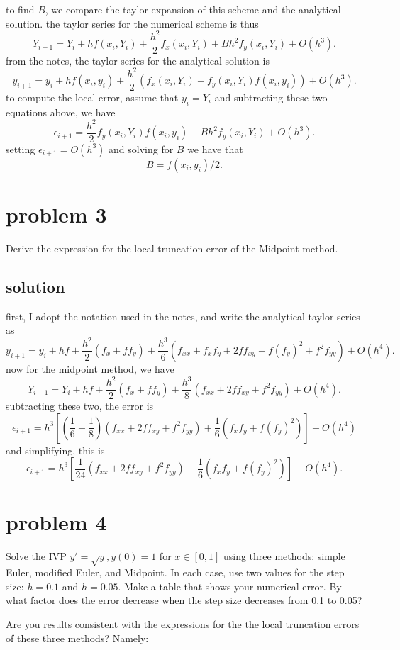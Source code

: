 \documentclass[letterpaper,10pt,english]{/Library/Python/2.7/site-packages/Sphinx-1.2-py2.7.egg/sphinx/texinputs/sphinxhowto}
\begin{document}
to find $B$, we compare the taylor expansion of this scheme and the
analytical solution. the taylor series for the numerical scheme is thus
\[ Y_{i+1} = Y_i + hf(x_i,Y_i) + \frac{h^2}{2} f_x (x_i,Y_i) + Bh^2 f_y(x_i,Y_i) + O(h^3) .\]
from the notes, the taylor series for the analytical solution is
\[ y_{i+1} = y_i + hf(x_i,y_i) + \frac{h^2}{2} (f_x (x_i,Y_i) + f_y(x_i,Y_i)f(x_i,y_i)) + O(h^3) .\]
to compute the local error, assume that $y_i = Y_i$ and subtracting
these two equations above, we have
\[ \epsilon _{i+1}  = \frac{h^2}{2}f_y(x_i,Y_i)f(x_i,y_i) - Bh^2 f_y(x_i,Y_i) + O(h^3) .\]
setting $\epsilon _{i+1} = O(h^3)$ and solving for $B$ we have that
\[ B = f(x_i,y_i) / 2.\]\section{problem 3}Derive the expression for the local truncation error of the Midpoint
method.\subsection{solution}first, I adopt the notation used in the notes, and write the analytical
taylor series as
\[ y_{i+1} = y_i + hf + \frac{h^2}{2} (f_x +ff_y) + \frac{h^3}{6} (f_{xx} + f_x f_y + 2 f f_{xy} + f (f_y)^2 + f^2 f_{yy} ) + O(h^4) .\]
now for the midpoint method, we have
\[ Y_{i+1} = Y_i + hf + \frac{h^2}{2} (f_x +ff_y) + \frac{h^3}{8} (f_{xx} + 2 f f_{xy} +  f^2 f_{yy} ) + O(h^4) .\]
subtracting these two, the error is
\[ \epsilon _{i+1}  = h^3 \left [ \left (\frac{1}{6} - \frac{1}{8} \right )  \left ( f_{xx} + 2ff_{xy} + f^2 f_{yy} \right ) + \frac{1}{6} \left ( f_xf_y + f (f_y)^2 \right ) \right ] + O(h^4)\]
and simplifying, this is
\[ \epsilon _{i+1}  = h^3 \left [ \frac{1}{24}  \left ( f_{xx} + 2ff_{xy} + f^2 f_{yy} \right ) + \frac{1}{6} \left ( f_xf_y + f (f_y)^2 \right ) \right ] + O(h^4).\]\section{problem 4}Solve the IVP $y' = \sqrt{y}, y(0) = 1$ for $x\in [0,1]$ using three
methods: simple Euler, modified Euler, and Midpoint. In each case, use
two values for the step size: $h = 0.1$ and $h=0.05$. Make a table that
shows your numerical error. By what factor does the error decrease when
the step size decreases from 0.1 to 0.05?

Are you results consistent with the expressions for the the local
truncation errors of these three methods? Namely:
\end{document}
